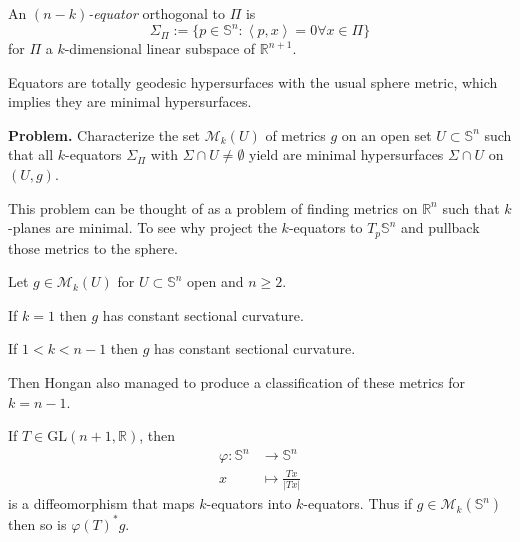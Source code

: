 \bigskip\noindent

\begin{definition}
\label{definition-equator}
An {\it $(n-k)$-equator} orthogonal to $\Pi$ is
$$
\Sigma_\Pi:=\{p\in\mathbb{S}^n:\left<p,x\right>=0\forall x\in\Pi\}
$$
for $\Pi$ a $k$-dimensional linear subspace of $\mathbb{R}^{n+1}$.
\end{definition}

\begin{remark}
\label{remark-equators-are-totally-geodesic-with-usual-metric}
Equators are totally geodesic hypersurfaces with the usual sphere metric, which
implies they are minimal hypersurfaces.
\end{remark}

{\bf Problem.} Characterize the set $\mathcal{M}_k(U)$ of metrics $g$ on an 
open set $U\subset\mathbb{S}^n$ such that all $k$-equators $\Sigma_\Pi$ with
 $\Sigma\cap U\neq\emptyset$ yield are minimal hypersurfaces $\Sigma\cap U$ 
on $(U,g)$.

\begin{remark}
\label{remark-why-not-Rn}
This problem can be thought of as a problem of finding metrics on $\mathbb{R}^n$
such that $k$-planes are minimal. To see why project the $k$-equators to
$T_p\mathbb{S}^n$ and pullback those metrics to the sphere.
\end{remark}

\medskip\noindent

Let $g\in\mathcal{M}_k(U)$ for $U\subset\mathbb{S}^n$ open and $n\geq 2$.

\begin{theorem}
\label{theorem-Beltrami-Schafli}
If $k=1$ then $g$ has constant sectional curvature.
\end{theorem}

\begin{theorem}[Hongan]
\label{theorem-Hongan}
If $1<k<n-1$ then $g$ has constant sectional curvature.
\end{theorem}

Then Hongan also managed to produce a classification of these metrics for
$k=n-1$.

\begin{remark}
\label{remark-linear-invertible-preserving-equators-is-in-Mg}
If $T\in \text{GL}(n+1,\mathbb{R})$, then
\begin{align*}
\varphi: \mathbb{S}^n &\longrightarrow \mathbb{S}^n \\
x &\longmapsto \frac{Tx}{|Tx|}
\end{align*}
is a diffeomorphism that maps $k$-equators into $k$-equators. Thus if
$g\in\mathcal{M}_k(\mathbb{S}^n)$ then so is $\varphi(T)^*g$.
\end{remark}

